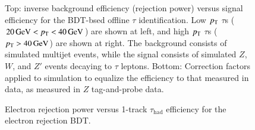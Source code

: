\begin{figure}
{	}
	\caption{Top: inverse background efficiency (rejection power) versus signal efficiency for the BDT-bsed offline $\tau$ identification. Low $p_{\text{T}}$ $\tau$s ($\SI{20}{\giga\electronvolt}<p_{\text{T}}<\SI{40}{\giga\electronvolt}$) are shown at left, and high $p_{\text{T}}$ $\tau$s ($p_{\text{T}}>\SI{40}{\giga\electronvolt}$) are shown at right. The background consists of simulated multijet events, while the signal consists of simulated $Z$, $W$, and $Z'$ events decaying to $\tau$ leptons. Bottom: Correction factors applied to simulation to equalize the efficiency to that measured in data, as measured in $Z$ tag-and-probe data.}
	\label{fig:reco-tau-efficiency}
\end{figure}

\begin{figure}
	\centering
	\caption{Electron rejection power versus 1-track $\tau_{\mathrm{had}}$ efficiency for the electron rejection BDT. }
	\label{fig:reco-tau-electron-rejection-efficiency}
\end{figure}

